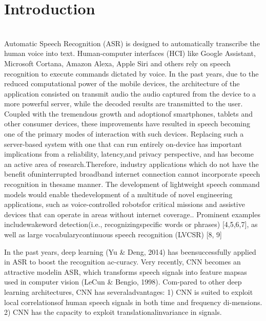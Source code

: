 
\section{Introduction}
\label{sec:introduction}

\\


Automatic Speech Recognition (ASR) is designed to automatically transcribe the human voice into text. Human-computer interfaces (HCI) like Google Assistant, Microsoft Cortana, Amazon Alexa, Apple Siri and others rely on speech recognition to execute commands dictated by voice.   In the past years, due to the reduced computational power of the mobile devices, the architecture of the application consisted on transmit audio the audio captured from the device to a more powerful server, while the decoded results are transmitted to the user. Coupled with the tremendous growth and adoptionof smartphones, tablets and other consumer devices, these improvements have resulted in speech becoming one of the primary modes of interaction with such devices. Replacing such a server-based system with one that can run entirely on-device has important implications from a reliability, latency,and privacy perspective, and has become an active area of research.Therefore, industry applications which do not have the benefit ofuninterrupted broadband internet connection cannot incorporate speech recognition in thesame manner.  The development of lightweight speech command models would enable thedevelopment of a multitude of novel engineering applications, such as voice-controlled robotsfor critical missions and assistive devices that can operate in areas without internet coverage..
Prominent examples includewakeword detection(i.e., recognizingspecific words or phrases) [4,5,6,7], as well as large vocabularycontinuous speech recognition (LVCSR) [8, 9]

In the past years, deep learning (Yu \& Deng, 2014) has beensuccessfully applied in ASR to boost the recognition ac-curacy.  Very recently, CNN becomes an attractive modelin ASR, which transforms speech signals into feature mapsas used in computer vision (LeCun \& Bengio, 1998). Com-pared to other deep learning architectures, CNN has severaladvantages:  1) CNN is suited to exploit local correlationsof  human  speech  signals  in  both  time  and  frequency  di-mensions. 2) CNN has the capacity to exploit translationalinvariance in signals.







